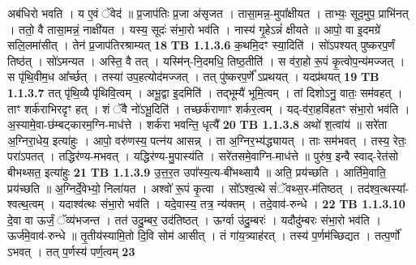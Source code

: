 \documentclass[17pt]{extarticle}
\begin{document}
                  अब॑धिरो भवति । य ए॒वं ॅवेद॑ ॥ प्र॒जाप॑तिः प्र॒जा अ॑सृजत । तासा॒मन्न॒-मुपा᳚क्षीयत । ताभ्यः॒ सूद॒मुप॒ प्राभि॑नत् । ततो॒ वै तासा॒मन्नं॒ नाक्षी॑यत । यस्य॒ सूदः॑ संभा॒रो भव॑ति । नास्य॑ गृ॒हेऽन्नं॑ क्षीयते ॥ आपो॒ वा इ॒दमग्रे॑ सलि॒लमा॑सीत् । तेन॑ प्र॒जाप॑तिरश्राम्यत् \textbf{ 18} \newline
                  \newline
                                \textbf{ TB 1.1.3.6} \newline
                  क॒थमि॒दꣳ स्या॒दिति॑ । सो॑ऽपश्यत् पुष्करप॒र्णं तिष्ठ॑त् । सो॑ऽमन्यत । अस्ति॒ वै तत् । यस्मि॑न्-नि॒दमधि॒ तिष्ठ॒तीति॑ । स व॑रा॒हो रू॒पं कृ॒त्वोप॒न्य॑मज्जत् । स पृ॑थि॒वीम॒ध आ᳚र्च्छत् । तस्या॑ उप॒हत्योद॑मज्जत् । तत् पु॑ष्करप॒र्णे᳚ ऽप्रथयत् । यदप्र॑थयत् \textbf{ 19} \newline
                  \newline
                                \textbf{ TB 1.1.3.7} \newline
                  तत् पृ॑थि॒व्यै पृ॑थिवि॒त्वम् । अभू॒द्वा इ॒दमिति॑ । तद्भूम्यै॑ भूमि॒त्वम् । तां दिशोऽनु॒ वातः॒ सम॑वहत् । ताꣳ शर्क॑राभिरदृꣳ हत् । शं ॅवै नो॑ऽभू॒दिति॑ । तच्छर्क॑राणाꣳ शर्कर॒त्वम् । यद्-व॑रा॒हवि॑हतꣳ संभा॒रो भव॑ति । अ॒स्यामे॒वा-छ॑म्बट्कारम॒ग्नि-माध॑त्ते । शर्क॑रा भवन्ति॒ धृत्यै᳚ \textbf{ 20} \newline
                  \newline
                                \textbf{ TB 1.1.3.8} \newline
                  अथो॑ श॒त्वांय॑ ॥ सरे॑ता अ॒ग्निरा॒धेय॒ इत्या॑हुः । आपो॒ वरु॑णस्य॒ पत्न॑य आसन्न् । ता अ॒ग्निर॒भ्य॑द्ध्यायत् । ताः सम॑भवत् । तस्य॒ रेतः॒ परा॑ऽपतत् । तद्धिर॑ण्य-मभवत् । यद्धिर॑ण्य-मु॒पास्य॑ति । सरे॑तसमे॒वाग्नि-माध॑त्ते ॥ पुरु॑ष॒ इन्वै स्वाद्-रेत॑सो बीभथ्सत॒ इत्या॑हुः \textbf{ 21} \newline
                  \newline
                                \textbf{ TB 1.1.3.9} \newline
                  उ॒त्त॒र॒त उपा᳚स्य॒त्य-बी॑भथ्सायै ॥ अति॒ प्रय॑च्छति । आर्ति॑मे॒वाति॒ प्रय॑च्छति ॥ अ॒ग्निर्दे॒वेभ्यो॒ निला॑यत । अश्वो॑ रू॒पं कृ॒त्वा । सो᳚ऽश्व॒त्थे सं॑ॅवथ्स॒र-म॑तिष्ठत् । तद॑श्व॒त्थस्या᳚-श्वत्थ॒त्वम् । यदाश्व॑त्थः संभा॒रो भव॑ति । यदे॒वास्य॒ तत्र॒ न्य॑क्तम् । तदे॒वाव॑-रुन्धे । \textbf{ 22} \newline
                  \newline
                                \textbf{ TB 1.1.3.10} \newline
                  दे॒वा वा ऊर्जं॒ ॅव्य॑भजन्त । तत॑ उदु॒म्बर॒ उद॑तिष्ठत् । ऊर्ग्वा उ॑दु॒म्बरः॑ । यदौदु॑म्बरः संभा॒रो भव॑ति । ऊर्ज॑मे॒वाव॑-रुन्धे ॥ तृ॒तीय॑स्यामि॒तो दि॒वि सोम॑ आसीत् । तं गा॑य॒त्र्याह॑रत् । तस्य॑ प॒र्णम॑च्छिद्यत । तत्प॒र्णो॑ ऽभवत् । तत् प॒र्णस्य॑ पर्ण॒त्वम् \textbf{ 23} \newline
\end{document}
